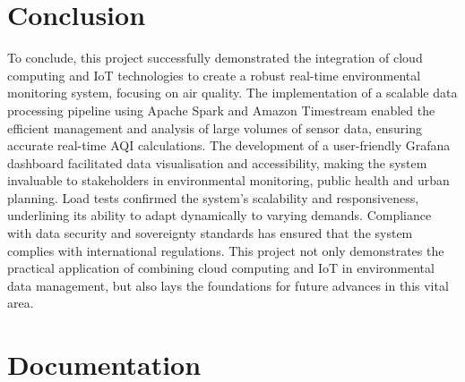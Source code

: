\documentclass[12pt,oneside]{book} %
\begin{document}
\chapter{Conclusion}
To conclude, this project successfully demonstrated the integration of cloud
computing and IoT technologies to create a robust real-time environmental
monitoring system, focusing on air quality. The implementation of a scalable
data processing pipeline using Apache Spark and Amazon Timestream enabled the
efficient management and analysis of large volumes of sensor data, ensuring
accurate real-time AQI calculations. The development of a user-friendly Grafana
dashboard facilitated data visualisation and accessibility, making the system
invaluable to stakeholders in environmental monitoring, public health and urban
planning. Load tests confirmed the system's scalability and responsiveness,
underlining its ability to adapt dynamically to varying demands. Compliance
with data security and sovereignty standards has ensured that the system
complies with international regulations. This project not only demonstrates the
practical application of combining cloud computing and IoT in environmental
data management, but also lays the foundations for future advances in this
vital area.




\appendix
\chapter{Documentation}
\end{document}
